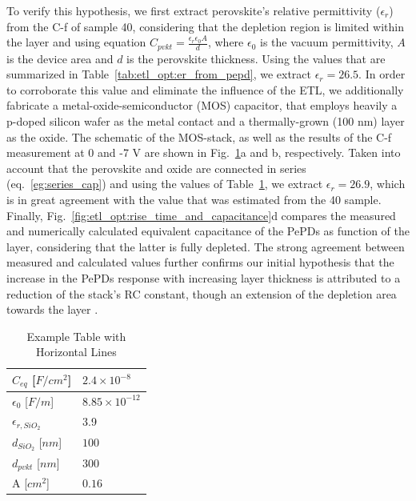 To verify this hypothesis, we first extract perovskite's relative permittivity ($\epsilon_r$) from the C-f of sample 40, considering that the depletion region is limited within the  layer and using equation $C_{pvkt} = \frac{\epsilon_r\epsilon_0A}{d}$, where $\epsilon_0$ is the vacuum permittivity, $A$ is the device area and $d$ is the perovskite thickness. Using the values that are summarized in Table~\ref{tab:etl_opt:er_from_pepd}, we extract $\epsilon_r = 26.5$. In order to corroborate this value and eliminate the influence of the ETL, we additionally fabricate a metal-oxide-semiconductor (MOS) capacitor, that employs heavily a p-doped silicon wafer as the metal contact and a thermally-grown  (100 nm) layer as the oxide. The schematic of the MOS-stack, as well as the results of the C-f measurement at 0 and -7 V are shown in Fig.~\ref{tab:etl_opt:er_from_mos}a and b, respectively. Taken into account that the perovskite and oxide are connected in series (eq.~\ref{eg:series_cap}) and using the values of Table~\ref{tab:etl_opt:er_from_mos}, we extract $\epsilon_r = 26.9$, which is in great agreement with the value that was estimated from the 40 sample. Finally, Fig.~\ref{fig:etl_opt:rise_time_and_capacitance}d compares the measured and numerically calculated equivalent capacitance of the PePDs as function of the  layer, considering that the latter is fully depleted. The strong agreement between measured and calculated values further confirms our initial hypothesis that the increase in the PePDs response with increasing  layer thickness is attributed to a reduction of the stack's RC constant, though an extension of the depletion area towards the  layer \cite{Goushcha2017OnPhotodiodes}. 

\begin{table}[htbp]
    \centering
    \renewcommand{\arraystretch}{1.5} %
    \begin{tabular}{@{} l l @{}}
        \hline
        $C_{eq}$ [$F/cm^2$] & $2.4\times10^{-8}$\\ \hline
        $\epsilon_0$ [$F/m$]& $8.85\times10^{-12}$ \\ \hline
        $\epsilon_{r,SiO_2}$ & 3.9 \\ \hline
        $d_{SiO_2}$ [$nm$] & $100$ \\ \hline
        $d_{pvkt}$ [$nm$] & $300$ \\ \hline
        A [$cm^2$] & $0.16$ \\ \hline
    \end{tabular}
    \caption{Example Table with Horizontal Lines} %
    \label{tab:etl_opt:er_from_mos} %
\end{table}

